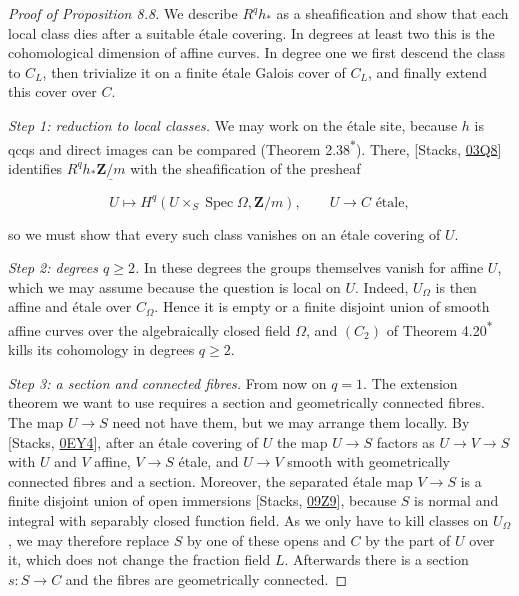 \documentclass[11pt]{article}
\newcommand{\bpout}[1]{#1\textsuperscript{\hyperlink{bp-outside}{\ensuremath{\ast}}}}
\begin{document}
\begin{proof}[{Proof of Proposition 8.8}]\label{bp34}%
We describe \(R^qh_*\) as a sheafification and show that each local class dies after a suitable étale covering. In degrees at least two this is the cohomological dimension of affine curves. In degree one we first descend the class to \(C_L\), then trivialize it on a finite étale Galois cover of \(C_L\), and finally extend this cover over \(C\).

\emph{Step 1: reduction to local classes.} We may work on the étale site, because \(h\) is qcqs and direct images can be compared (Theorem \bpout{2.38}). There, [Stacks, \href{https://stacks.math.columbia.edu/tag/03Q8}{03Q8}] identifies \(R^qh_*\underline{\mathbf Z/m}\) with the sheafification of the presheaf

\[
U\longmapsto H^q(U\times_S\operatorname{Spec}\Omega,
\mathbf Z/m),
\qquad U\to C\text{ \'etale},
\]

so we must show that every such class vanishes on an étale covering of \(U\).

\emph{Step 2: degrees \(q\geq2\).} In these degrees the groups themselves vanish for affine \(U\), which we may assume because the question is local on \(U\). Indeed, \(U_\Omega\) is then affine and étale over \(C_\Omega\). Hence it is empty or a finite disjoint union of smooth affine curves over the algebraically closed field \(\Omega\), and \((C_2)\) of Theorem \bpout{4.20} kills its cohomology in degrees \(q\geq2\).

\emph{Step 3: a section and connected fibres.} From now on \(q=1\). The extension theorem we want to use requires a section and geometrically connected fibres. The map \(U\to S\) need not have them, but we may arrange them locally. By [Stacks, \href{https://stacks.math.columbia.edu/tag/0EY4}{0EY4}], after an étale covering of \(U\) the map \(U\to S\) factors as \(U\to V\to S\) with \(U\) and \(V\) affine, \(V\to S\) étale, and \(U\to V\) smooth with geometrically connected fibres and a section. Moreover, the separated étale map \(V\to S\) is a finite disjoint union of open immersions [Stacks, \href{https://stacks.math.columbia.edu/tag/09Z9}{09Z9}], because \(S\) is normal and integral with separably closed function field. As we only have to kill classes on \(U_\Omega\), we may therefore replace \(S\) by one of these opens and \(C\) by the part of \(U\) over it, which does not change the fraction field \(L\). Afterwards there is a section \(s:S\to C\) and the fibres are geometrically connected.


\end{proof}
\end{document}
